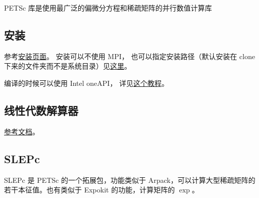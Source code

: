 
\begin{issues}
\issueDraft
\end{issues}

PETSc 库是使用最广泛的偏微分方程和稀疏矩阵的并行数值计算库

\subsection{安装}
参考\href{https://petsc.org/release/install/install_tutorial/}{安装页面}。
安装可以不使用 MPI， 也可以指定安装路径（默认安装在 clone 下来的文件夹而不是系统目录）见\href{https://petsc.org/release/install/install/#mpi-problems-i-don-t-want-mpi}{这里}。

编译的时候可以使用 Intel oneAPI， 详见\href{https://www.intel.com/content/www/us/en/developer/articles/technical/mkl-blas-lapack-with-petsc.html}{这个教程}。

\subsection{线性代数解算器}
\href{https://petsc.org/release/docs/manual/ksp/}{参考文档}。

\subsection{SLEPc}
SLEPc 是 PETSc 的一个拓展包，功能类似于 Arpack，可以计算大型稀疏矩阵的若干本征值。也有类似于 Expokit 的功能，计算矩阵的 $\exp$。

